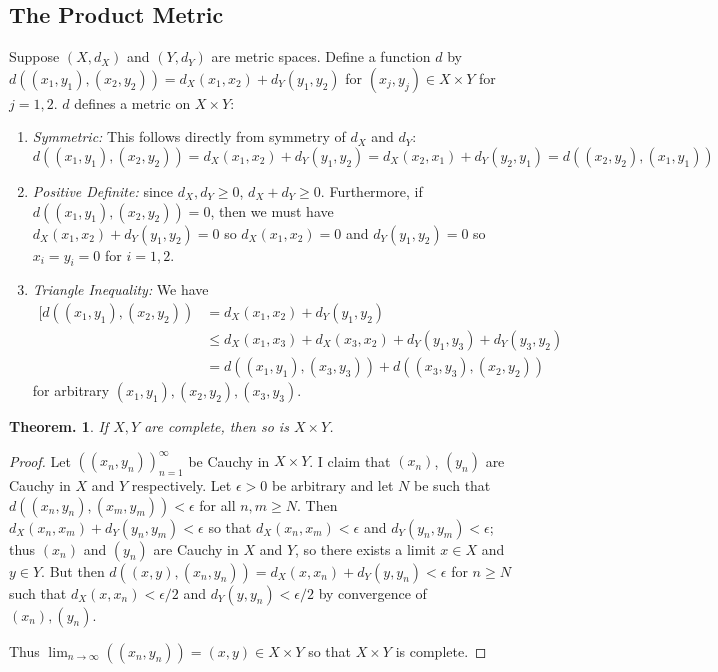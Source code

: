 \documentclass[11pt, a4paper]{memoir}
\theoremstyle{change}
\newtheorem{theorem}{Theorem.}[section]
\theoremstyle{plain}
\theoremstyle{nonumberplain}
\newtheorem{proof}{Proof}
\numberwithin{equation}{section}
\begin{document}
\subsection{The Product Metric}
Suppose $(X,d_X)$ and $(Y,d_Y)$ are metric spaces.
Define a function $d$ by $d( (x_1,y_1),(x_2,y_2))= d_X(x_1,x_2)+d_Y(y_1,y_2)$ for $(x_j,y_j)\in X\times Y$ for $j=1,2$.
$d$ defines a metric on $X\times Y$:
\begin{enumerate}
    \item \textit{Symmetric:} This follows directly from symmetry of $d_X$ and $d_Y$:
        \[d( (x_1,y_1),(x_2,y_2) ) = d_X(x_1,x_2)+d_Y(y_1,y_2) = d_X(x_2,x_1)+d_Y(y_2,y_1)=d( (x_2,y_2),(x_1,y_1) )\]
    \item \textit{Positive Definite:} since $d_X,d_Y\geq 0$, $d_X+d_Y\geq 0$. Furthermore, if $d( (x_1,y_1),(x_2,y_2) )=0$,
        then we must have $d_X(x_1,x_2)+d_Y(y_1,y_2)=0$ so $d_X(x_1,x_2)=0$ and $d_Y(y_1,y_2)=0$
        so $x_i=y_i=0$ for $i=1,2$.
    \item \textit{Triangle Inequality:} We have
        \begin{align*}
            [d( (x_1,y_1),(x_2,y_2) ) &= d_X(x_1,x_2)+d_Y(y_1,y_2) \\
                                      &\leq d_X(x_1,x_3)+d_X(x_3,x_2)+d_Y(y_1,y_3)+d_Y(y_3,y_2)\\
                                      &= d( (x_1,y_1),(x_3,y_3)) + d( (x_3,y_3),(x_2,y_2) )
        \end{align*}
        for arbitrary $(x_1,y_1), (x_2,y_2), (x_3,y_3)$.
\end{enumerate}
\begin{theorem}
    If $X,Y$ are complete, then so is $X\times Y$.
\end{theorem}
\begin{proof}
    Let $( (x_n,y_n) )_{n=1}^\infty$ be Cauchy in $X\times Y$. I claim that $(x_n)$, $(y_n)$ are Cauchy
    in $X$ and $Y$ respectively. Let $\epsilon>0$ be arbitrary and let $N$ be such that
    $d( (x_n,y_n),(x_m,y_m) )<\epsilon$ for all $n,m\geq N$. Then $d_X(x_n,x_m)+d_Y(y_n,y_m)<\epsilon$ so that
    $d_X(x_n,x_m)<\epsilon$ and $d_Y(y_n,y_m)<\epsilon$; thus $(x_n)$ and $(y_n)$ are Cauchy in $X$ and $Y$,
    so there exists a limit $x\in X$ and $y\in Y$. But then $d( (x,y),(x_n,y_n) )=d_X(x,x_n)+d_Y(y,y_n)<\epsilon$
    for $n\geq N$ such that $d_X(x,x_n)<\epsilon/2$ and $d_Y(y,y_n)<\epsilon/2$ by convergence of $(x_n),(y_n)$.

    Thus $\lim_{n\to\infty}( (x_n,y_n) )=(x,y)\in X\times Y$ so that $X\times Y$ is complete.
\end{proof}
\end{document}
